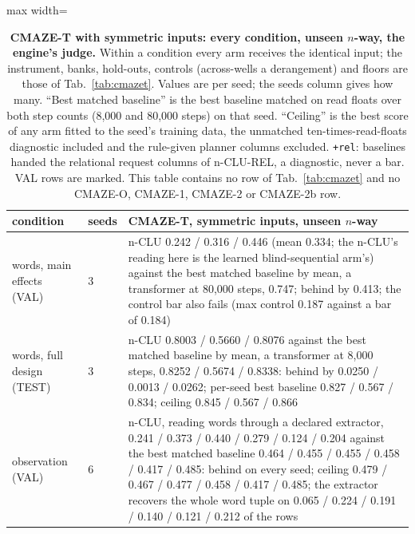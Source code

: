 \documentclass{article} %
\begin{document}
\begin{table}[h]
\centering\scriptsize
\caption{\textbf{CMAZE-T with symmetric inputs: every condition, unseen $n$-way, the engine's judge.} Within a %
condition every arm receives the identical input; the instrument, banks, hold-outs, controls
(across-wells a derangement) and floors are those of Tab.~\ref{tab:cmazet}. Values are per seed; the
seeds column gives how many. ``Best matched baseline'' is the best baseline matched on read floats over both
step counts (8,000 and 80,000 steps) on that seed. ``Ceiling'' is the best score of any arm %
fitted to the seed's training data, the unmatched ten-times-read-floats diagnostic included and the
rule-given planner columns excluded. \texttt{+rel}: baselines handed the relational request columns of
n-CLU-REL, a diagnostic, never a bar. VAL rows are marked. This table contains no row of
Tab.~\ref{tab:cmazet} and no CMAZE-O, CMAZE-1, CMAZE-2 or CMAZE-2b row.}
\label{tab:cmazet-sym}
\setlength{\tabcolsep}{2pt}
\begin{adjustbox}{max width=\linewidth}\begin{tabular}{p{2.2cm}p{0.6cm}p{10.3cm}}
\toprule
condition & seeds & CMAZE-T, symmetric inputs, unseen $n$-way \\
\midrule
words, main effects (VAL) & 3 & n-CLU 0.242 / 0.316 / 0.446 (mean 0.334; the n-CLU's reading here is the learned blind-sequential arm's) against the best matched baseline by mean, a transformer at 80,000 steps, 0.747; behind by 0.413; the control bar also fails (max control 0.187 against a bar of 0.184) \\
words, full design (TEST) & 3 & n-CLU 0.8003 / 0.5660 / 0.8076 against the best matched baseline by mean, a transformer at 8,000 steps, 0.8252 / 0.5674 / 0.8338: behind by 0.0250 / 0.0013 / 0.0262; per-seed best baseline 0.827 / 0.567 / 0.834; ceiling 0.845 / 0.567 / 0.866 \\
observation (VAL) & 6 & n-CLU, reading words through a declared extractor, 0.241 / 0.373 / 0.440 / 0.279 / 0.124 / 0.204 against the best matched baseline 0.464 / 0.455 / 0.455 / 0.458 / 0.417 / 0.485: behind on every seed; ceiling 0.479 / 0.467 / 0.477 / 0.458 / 0.417 / 0.485; the extractor recovers the whole word tuple on 0.065 / 0.224 / 0.191 / 0.140 / 0.121 / 0.212 of the rows \\

\end{tabular}
\end{adjustbox}
\end{table}
\end{document}
